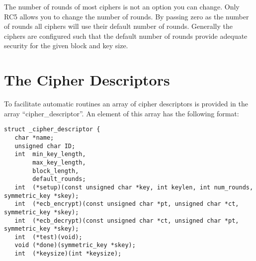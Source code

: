 \documentclass[a4paper]{book}
\begin{document}
The number of rounds of most ciphers is not an option you can change.  Only RC5 allows you to change the number of
rounds.  By passing zero as the number of rounds all ciphers will use their default number of rounds.  Generally the
ciphers are configured such that the default number of rounds provide adequate security for the given block and key 
size.

\section{The Cipher Descriptors}
To facilitate automatic routines an array of cipher descriptors is provided in the array ``cipher\_descriptor''.  An element
of this array has the following format:

\begin{small}
\begin{verbatim}
struct _cipher_descriptor {
   char *name;
   unsigned char ID;
   int  min_key_length, 
        max_key_length, 
        block_length, 
        default_rounds;
   int  (*setup)(const unsigned char *key, int keylen, int num_rounds, symmetric_key *skey);
   int  (*ecb_encrypt)(const unsigned char *pt, unsigned char *ct, symmetric_key *skey);
   int  (*ecb_decrypt)(const unsigned char *ct, unsigned char *pt, symmetric_key *skey);
   int  (*test)(void);
   void (*done)(symmetric_key *skey);      
   int  (*keysize)(int *keysize);


\end{verbatim}
\end{small}
\end{document}
